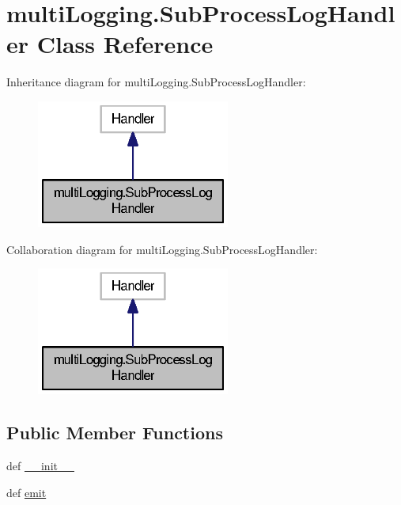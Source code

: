 \section{multi\-Logging.\-Sub\-Process\-Log\-Handler Class Reference}
\label{classmultiLogging_1_1SubProcessLogHandler}


Inheritance diagram for multi\-Logging.\-Sub\-Process\-Log\-Handler\-:
\nopagebreak
\begin{figure}[H]
\begin{center}
\leavevmode
\includegraphics[width=180pt]{classmultiLogging_1_1SubProcessLogHandler__inherit__graph}
\end{center}
\end{figure}


Collaboration diagram for multi\-Logging.\-Sub\-Process\-Log\-Handler\-:
\nopagebreak
\begin{figure}[H]
\begin{center}
\leavevmode
\includegraphics[width=180pt]{classmultiLogging_1_1SubProcessLogHandler__coll__graph}
\end{center}
\end{figure}
\subsection*{Public Member Functions}
\begin{DoxyCompactItemize}
\item 
def \hyperlink{classmultiLogging_1_1SubProcessLogHandler_aeb3f6aa0f57f68dd21660704876e40b4}{\-\_\-\-\_\-init\-\_\-\-\_\-}
\item 
def \hyperlink{classmultiLogging_1_1SubProcessLogHandler_a6ce2c3d0d33ec44dd1e8ad814a83030e}{emit}
\end{DoxyCompactItemize}
